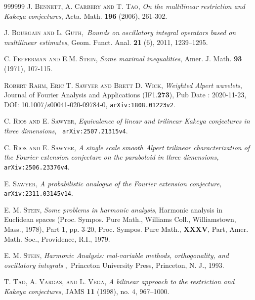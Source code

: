 \documentclass{amsart}%
\theoremstyle{plain}
\numberwithin{equation}{section}
\begin{document}
\begin{thebibliography}{999999}                                                                                           %
\textsc{J. Bennett, A. Carbery and T. Tao}, \textit{On
the multilinear restriction and Kakeya conjectures}, Acta. Math. \textbf{196}
(2006), 261-302.

\textsc{J. Bourgain and L. Guth},\textit{\ Bounds on
oscillatory integral operators based on multilinear estimates}, Geom. Funct.
Anal. \textbf{21} (6), 2011, 1239--1295.

\textsc{C. Fefferman and E.M. Stein}, \textit{Some maximal
inequalities}, Amer. J. Math. \textbf{93} (1971), 107-115.

\textsc{Robert Rahm, Eric T. Sawyer and Brett D.
Wick,} \textit{Weighted Alpert wavelets}, Journal of Fourier Analysis and
Applications (IF1.\textbf{273}), Pub Date : 2020-11-23, DOI:
10.1007/s00041-020-09784-0, \texttt{arXiv:1808.01223v2}.

\textsc{C. Rios and E. Sawyer,} \textit{Equivalence of
linear and trilinear Kakeya conjectures in three dimensions},\textit{\ }%
\texttt{arXiv:2507.21315v4}.

\textsc{C. Rios and E. Sawyer,} \textit{A single scale
smooth Alpert trilinear characterization of the Fourier extension conjecture
on the paraboloid in three dimensions, }\texttt{arXiv:2506.23376v4}.

\textsc{E. Sawyer,} \textit{A probabilistic analogue of
the Fourier extension conjecture, }\texttt{arXiv:2311.03145v14}.

\textsc{E. M. Stein,} \textit{Some problems in harmonic
analysis}, Harmonic analysis in Euclidean spaces (Proc. Sympos. Pure Math.,
Williams Coll., Williamstown, Mass., 1978), Part 1, pp. 3-20, Proc. Sympos.
Pure Math., \textbf{XXXV}, Part, Amer. Math. Soc., Providence, R.I., 1979.

\textsc{E. M. Stein,} \textit{Harmonic Analysis:
real-variable methods, orthogonality, and oscillatory integrals}%
,\textit{\ }Princeton University Press, Princeton, N. J., 1993.

\textsc{T. Tao, A. Vargas, and L. Vega}, \textit{A
bilinear approach to the restriction and Kakeya conjectures}, JAMS \textbf{11}
(1998), no. 4, 967--1000.
\end{thebibliography}
\end{document}
